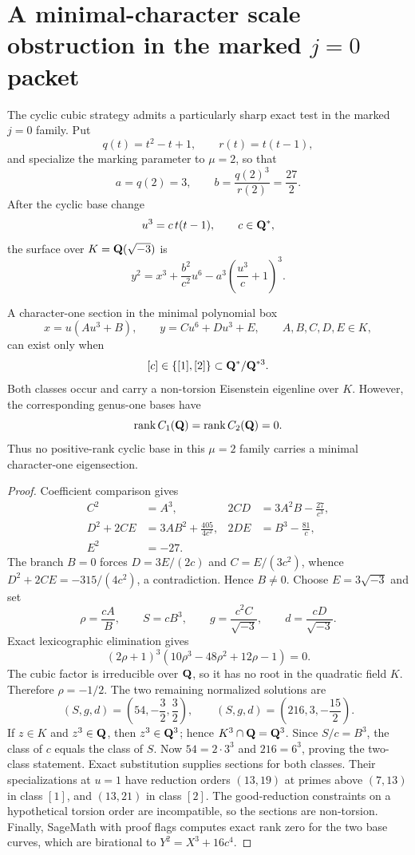 \section{A minimal-character scale obstruction in the marked $j=0$ packet}

The cyclic cubic strategy admits a particularly sharp exact test in the
marked $j=0$ family. Put
\[
q(t)=t^2-t+1,\qquad r(t)=t(t-1),
\]
and specialize the marking parameter to $\mu=2$, so that
\[
a=q(2)=3,\qquad b=\frac{q(2)^3}{r(2)}=\frac{27}{2}.
\]
After the cyclic base change
\[
u^3=c\,t(t-1),\qquad c\in\mathbf Q^*,
\]
the surface over $K=\mathbf Q(\sqrt{-3})$ is
\[
y^2=x^3+\frac{b^2}{c^2}u^6-a^3\left(\frac{u^3}{c}+1\right)^3.
\]

\begin{theorem}
A character-one section in the minimal polynomial box
\[
x=u(Au^3+B),\qquad y=Cu^6+Du^3+E,
\qquad A,B,C,D,E\in K,
\]
can exist only when
\[
[c]\in\{[1],[2]\}\subset\mathbf Q^*/\mathbf Q^{*3}.
\]
Both classes occur and carry a non-torsion Eisenstein eigenline over $K$.
However, the corresponding genus-one bases have
\[
\operatorname{rank} C_1(\mathbf Q)=\operatorname{rank} C_2(\mathbf Q)=0.
\]
Thus no positive-rank cyclic base in this $\mu=2$ family carries a minimal
character-one eigensection.
\end{theorem}

\begin{proof}
Coefficient comparison gives
\[
\begin{aligned}
C^2&=A^3,&
2CD&=3A^2B-\frac{27}{c^3},\\
D^2+2CE&=3AB^2+\frac{405}{4c^2},&
2DE&=B^3-\frac{81}{c},\\
E^2&=-27.&&
\end{aligned}
\]
The branch $B=0$ forces
$D=3E/(2c)$ and $C=E/(3c^2)$, whence
$D^2+2CE=-315/(4c^2)$, a contradiction. Hence $B\ne0$.
Choose $E=3\sqrt{-3}$ and set
\[
\rho=\frac{cA}{B},\qquad S=cB^3,
\qquad g=\frac{c^2C}{\sqrt{-3}},
\qquad d=\frac{cD}{\sqrt{-3}}.
\]
Exact lexicographic elimination gives
\[
(2\rho+1)^3(10\rho^3-48\rho^2+12\rho-1)=0.
\]
The cubic factor is irreducible over $\mathbf Q$, so it has no root in the quadratic
field $K$. Therefore $\rho=-1/2$. The two remaining normalized solutions
are
\[
(S,g,d)=\left(54,-\frac32,\frac32\right),
\qquad
(S,g,d)=\left(216,3,-\frac{15}{2}\right).
\]
If $z\in K$ and $z^3\in\mathbf Q$, then $z^3\in\mathbf Q^3$; hence
$K^3\cap\mathbf Q=\mathbf Q^3$. Since $S/c=B^3$, the class of $c$ equals the class of
$S$. Now $54=2\cdot3^3$ and $216=6^3$, proving the two-class statement.
Exact substitution supplies sections for both classes. Their specializations
at $u=1$ have reduction orders $(13,19)$ at primes above $(7,13)$ in class
$[1]$, and $(13,21)$ in class $[2]$. The good-reduction constraints on a
hypothetical torsion order are incompatible, so the sections are non-torsion.
Finally, SageMath with proof flags computes exact rank zero for the two base
curves, which are birational to $Y^2=X^3+16c^4$.
\end{proof}

